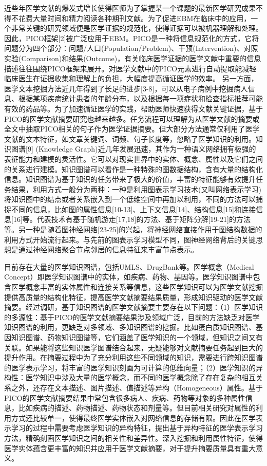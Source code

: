 \documentclass[algorithmlist, figurelist,tablelist, nomlist,masters]{seuthesix}
\begin{document}
近些年医学文献的爆发式增长使得医师为了掌握某一个课题的最新医学研究成果不得不花费大量时间和精力阅读各种期刊文献。为了促进EBM在临床中的应用，一个非常关键的研究领域便是医学证据的规范化，使得证据可以被机器理解和处理。因此，PICO框架[2]被广泛应用于EBM。PICO是一种将信息规范化的方式，它将问题分为四个部分：问题/人口(Population/Problem)、干预(Intervention)、对照实验(Comparison)和结果(Outcome)，有关临床医学证据的医学文献中重要的信息描述往往围绕PICO框架来展开。对医学文献中的PICO元素进行自动提取能减轻临床医生在证据收集和理解上的负担，大幅度提高循证医学的效率。
另一方面，医学文本挖掘方法近几年得到了长足的进步[3-8]，可以从电子病例中挖掘病人信息、根据某项疾病统计患者的年龄分布，以及根据每一项症状和检查指标推荐可能有效的药品等。为了加速循证医学的实践，帮助医师快速获得文献关键证据，基于PICO的医学文献摘要研究也越来越多。任务流程可以理解为从医学文献的摘要或全文中抽取PICO相关的句子作为医学证据摘要。但大部分方法通常仅利用了医学文献的文本特征，如文章关键词、词频、句子长度等，忽略了医学知识的利用。知识图谱[9] (Knowledge Graph)近几年发展迅速，其作为一种语义网络拥有极强的表征能力和建模的灵活性。它可以对现实世界中的实体、概念、属性以及它们之间的关系进行建模。知识图谱可以看作是一种特殊的图数据结构，含有大量的结构化信息。知识图谱为基于知识的任务带来了极大的价值，丰富的特征能够有效提升任务结果，利用方式一般分为两种：一种是利用图表示学习技术(又叫网络表示学习)将知识图中的结点或者关系嵌入到一个低维空间中再加以利用，不同的方法可以捕捉不同的信息，比如图的属性信息[10-13]、上下文信息[14]、结构信息[15]和连接信息[16]等。代表技术有基于随机游走[17,18]的方法、基于矩阵分解[19-21]的方法等。另一种是随着图神经网络[23-25]的兴起，将神经网络直接作用于图结构数据的利用方式开始流行起来。与先前的图表示学习模型不同，图神经网络背后的关键思想是通过神经网络聚合节点邻居的信息特征来丰富节点表示。

目前存在大量的医学知识图谱，包括UMLS、DrugBank等。医学概念（Medical Concept）即医学知识图谱中的实体，如疾病、药物、基因等。医学知识图谱中包含医学概念丰富的实体属性和连接关系等信息，这些医学知识可以为医学文献挖掘提供高质量的结构化特征，提高医学文献摘要结果质量，形成知识驱动的医学文献摘要。经过调研，基于知识图谱的医学文献摘要主要存在以下问题：（1）医学知识的多源性：基于PICO的医学文献摘要结果涉及领域广泛，目前的方法缺乏对医学知识图谱的利用，更缺乏对多领域、多知识图谱的挖掘。比如蛋白质知识图谱、基因知识图谱、药物知识图谱等，它们涵盖了医学知识的一个领域，但知识之间又有关联。如果能将这些知识医学图谱结合起来，无疑能够对文献摘要任务起到巨大的提升作用。在摘要过程中为了充分利用这些不同领域的知识，需要进行跨知识图谱的医学表示学习，将丰富的医学知识刻画为可计算的低维向量；（2）医学知识的异构性：医学知识中涉及大量的医学概念，而不同的医学概念除了存在复杂的相互关系之外，还存在文本描述、图片描述、值描述等异构（Homogeneous）属性。基于PICO的医学文献摘要结果中常包含很多病人、疾病、药物等对象的多种属性信息，比如疾病的描述、药物描述、药物状态和剂量等。但目前相关研究对属性的利用方式还比较单一，使得最终医学实体嵌入对网络信息的存储有限。因此在医学表示学习的过程中需要考虑医学知识的异构特征，提出基于异构特征的医学表示学习方法，精确刻画医学知识之间的相关性和差异性。深入挖掘和利用属性特征，使得医学实体蕴含更丰富的知识并应用于医学文献摘要，对于提升摘要质量具有重大意义。
\end{document}
